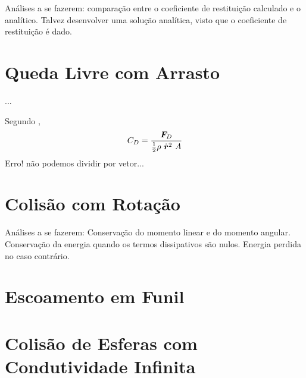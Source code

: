 \alert{Análises a se fazerem: comparação entre o coeficiente de restituição calculado e o analítico. Talvez desenvolver uma solução analítica, visto que o coeficiente de restituição é dado.}

\section{Queda Livre com Arrasto}

\alert{...}

Segundo ,
\begin{equation*}
	\dragCoefficient = \dfrac{\dragForce}{\frac{1}{2}\density\ \velocity^2\ \projectedArea}
\end{equation*}
\alert{Erro! não podemos dividir por vetor...}

\section{Colisão com Rotação}

\alert{Análises a se fazerem: Conservação do momento linear e do momento angular. Conservação da energia quando os termos dissipativos são nulos. Energia perdida no caso contrário.}

\section{Escoamento em Funil}
\section{Colisão de Esferas com Condutividade Infinita}